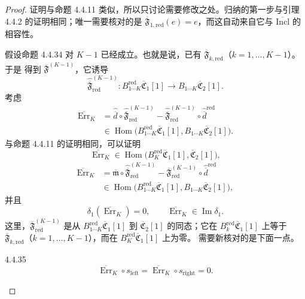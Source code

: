 \begin{proof}
证明与命题 4.4.11 类似，所以只讨论需要修改之处。归纳的第一步与引理
4.4.2 的证明相同；唯一需要核对的是
$\overline{\mathfrak F}_{1,\mathrm{red}}(e)=e$，而这自动来自它与
$\overline{\mathrm{Incl}}$ 的相容性。

假设命题 4.4.34 对 $K-1$ 已经成立。也就是说，已有
$\overline{\mathfrak F}_{k,\mathrm{red}}$（$k=1,\ldots,K-1$）。于是
得到 $\overline{\mathfrak F}^{(K-1)}$，它诱导
\[
 \widehat{\overline{\mathfrak F}}_{\mathrm{red}}^{(K-1)}\colon
 B_{1\cdots K}^{\mathrm{red}}\overline{\mathfrak C}_1[1]
 \longrightarrow B_{1\cdots K}\overline{\mathfrak C}_2[1].
\]
考虑
\[
 \begin{aligned}
 \overline{\operatorname{Err}}_K
 &={}
 \widehat{\overline d}\circ
 \widehat{\overline{\mathfrak F}}_{\mathrm{red}}^{(K-1)}
 -\widehat{\overline{\mathfrak F}}_{\mathrm{red}}^{(K-1)}
 \circ\widehat{\overline d}^{\mathrm{red}}\\
 &\in\operatorname{Hom}\bigl(
 B_{1\cdots K}^{\mathrm{red}}\overline{\mathfrak C}_1[1],
 B_{1\cdots K}\overline{\mathfrak C}_2[1]
 \bigr).
 \end{aligned}
\]
与命题 4.4.11 的证明相同，可以证明
\[
 \overline{\operatorname{Err}}_K
 \in\operatorname{Hom}\bigl(
 B_K^{\mathrm{red}}\overline{\mathfrak C}_1[1],
 \overline{\mathfrak C}_2[1]
 \bigr),
\]
\[
 \begin{aligned}
 \overline{\operatorname{Err}}_K
 &={}
 \overline{\mathfrak m}\circ
 \widehat{\overline{\mathfrak F}}_{\mathrm{red}}^{(K-1)}
 -\overline{\mathfrak F}_{\mathrm{red}}^{(K-1)}
 \circ\widehat{\overline d}^{\mathrm{red}}\\
 &\in\operatorname{Hom}\bigl(
 B_{1\cdots K}^{\mathrm{red}}\overline{\mathfrak C}_1[1],
 B_{1\cdots K}\overline{\mathfrak C}_2[1]
 \bigr),
 \end{aligned}
\]
并且
\[
 \delta_1(\overline{\operatorname{Err}}_K)=0,
 \qquad
 \overline{\operatorname{Err}}_K\in\operatorname{Im}\delta_1.
\]
这里，$\overline{\mathfrak F}_{\mathrm{red}}^{(K-1)}$ 是从
$B_{1\cdots K}^{\mathrm{red}}\overline{\mathfrak C}_1[1]$ 到
$\overline{\mathfrak C}_2[1]$ 的同态；它在
$B_k^{\mathrm{red}}\overline{\mathfrak C}_1[1]$ 上等于
$\overline{\mathfrak F}_{k,\mathrm{red}}$（$k=1,\ldots,K-1$），而在
$B_K^{\mathrm{red}}\overline{\mathfrak C}_1[1]$ 上为零。
需要新核对的是下面一点。

\begin{lemma}{4.4.35}\label{lem:4-4-35}
\[
 \overline{\operatorname{Err}}_K\circ s_{\mathrm{left}}
 =\overline{\operatorname{Err}}_K\circ s_{\mathrm{right}}=0.
\]
\end{lemma}


\end{proof}

